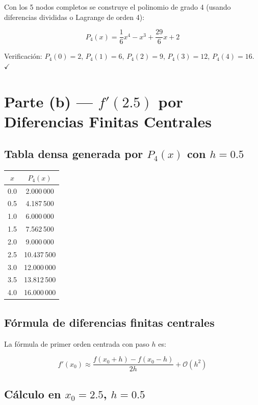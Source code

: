 \documentclass[12pt,a4paper]{article}
\begin{document}
Con los 5 nodos completos se construye el polinomio de grado 4
(usando diferencias divididas o Lagrange de orden 4):

\[
  P_4(x) = \frac{1}{6}x^4 - x^3 + \frac{29}{6}x + 2
\]

Verificaci\'on: $P_4(0)=2$, $P_4(1)=6$, $P_4(2)=9$,
$P_4(3)=12$, $P_4(4)=16$. $\checkmark$

\section*{Parte (b) --- $f'(2.5)$ por Diferencias Finitas Centrales}

\subsection*{Tabla densa generada por $P_4(x)$ con $h=0.5$}

\begin{center}
\renewcommand{\arraystretch}{1.3}
\begin{tabular}{cc}
\toprule
$x$ & $P_4(x)$ \\
\midrule
0.0 &  2.000\,000 \\
0.5 &  4.187\,500 \\
1.0 &  6.000\,000 \\
1.5 &  7.562\,500 \\
2.0 &  9.000\,000 \\
2.5 & 10.437\,500 \\
3.0 & 12.000\,000 \\
3.5 & 13.812\,500 \\
4.0 & 16.000\,000 \\
\bottomrule
\end{tabular}
\end{center}

\subsection*{F\'ormula de diferencias finitas centrales}

La f\'ormula de primer orden centrada con paso $h$ es:

\[
  f'(x_0) \approx \frac{f(x_0+h) - f(x_0-h)}{2h}
  + \mathcal{O}(h^2)
\]

\subsection*{C\'alculo en $x_0 = 2.5$, $h = 0.5$}
\end{document}
